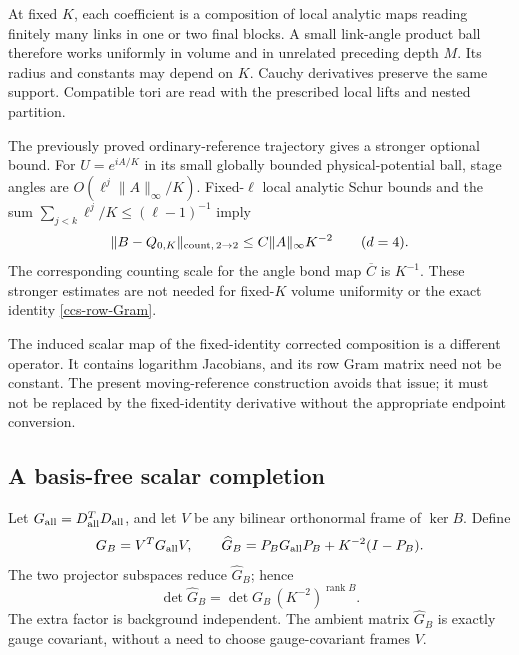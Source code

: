 At fixed \(K\), each coefficient is a composition of local
analytic maps reading finitely many links in one or two final
blocks. A small link-angle product ball therefore works uniformly
in volume and in unrelated preceding depth \(M\).
Its radius and constants may depend on \(K\).
Cauchy derivatives preserve the same support. Compatible tori
are read with the prescribed local lifts and nested partition.

The previously proved ordinary-reference trajectory gives a
stronger optional bound. For \(U=e^{iA/K}\) in its small globally
bounded physical-potential ball, stage angles are
\(O(\ell^j\|A\|_\infty/K)\). Fixed-\(\ell\) local analytic
Schur bounds and the sum
\(\sum_{j<k}\ell^j/K\le(\ell-1)^{-1}\) imply
\begin{equation}
 \|B-Q_{0,K}\|_{{\rm count},\,2\to2}
                    \le C\|A\|_\infty K^{-2}
                    \qquad(d=4).
 \label{ccs-physical-smallness}
\end{equation}
The corresponding counting scale for the angle bond map
\(\overline C\) is \(K^{-1}\).
These stronger estimates are not needed for fixed-\(K\)
volume uniformity or the exact identity
\eqref{ccs-row-Gram}.

The induced scalar map of the fixed-identity corrected
composition is a different operator. It contains logarithm
Jacobians, and its row Gram matrix need not be constant.
The present moving-reference construction avoids that issue;
it must not be replaced by the fixed-identity derivative
without the appropriate endpoint conversion.

\subsection{A basis-free scalar completion}
\label{ccs-completion-section}

Let \(G_{\rm all}=D_{\rm all}^TD_{\rm all}\), and let \(V\)
be any bilinear orthonormal frame of \(\ker B\). Define
\begin{equation}
 G_B=V^TG_{\rm all}V,\qquad
 \widehat G_B=P_BG_{\rm all}P_B+K^{-2}(I-P_B).
 \label{ccs-completion}
\end{equation}
The two projector subspaces reduce \(\widehat G_B\); hence
\begin{equation}
       \det\widehat G_B=\det G_B\,
                        (K^{-2})^{\operatorname{rank}B}.
 \label{ccs-completion-determinant}
\end{equation}
The extra factor is background independent.
The ambient matrix \(\widehat G_B\) is exactly gauge covariant,
without a need to choose gauge-covariant frames \(V\).

